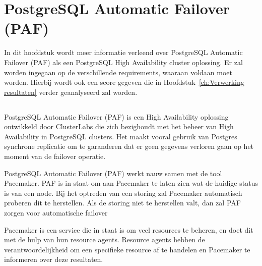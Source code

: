 
\chapter{PostgreSQL Automatic Failover (PAF)}
\label{ch:PostgreSQL Automatic Failover (PAF)}

In dit hoofdstuk wordt meer informatie verleend over PostgreSQL Automatic Failover (PAF) als een PostgreSQL High Availability cluster oplossing. Er zal worden ingegaan op de verschillende requirements, waaraan voldaan moet worden. Hierbij wordt ook een score gegeven die in Hoofdstuk~\ref{ch:Verwerking resultaten} verder geanalyseerd zal worden.



\section{}
\label{sec:Inleiding tot PostgreSQL Automatic Failover (PAF)}

PostgreSQL Automatic Failover (PAF) is een High Availability oplossing ontwikkeld door ClusterLabs die zich bezighoudt met het beheer van High Availability in PostgreSQL clusters. Het maakt vooral gebruik van Postgres synchrone replicatie om te garanderen dat er geen gegevens verloren gaan op het moment van de failover operatie. 

PostgreSQL Automatic Failover (PAF) werkt nauw samen met de tool Pacemaker. PAF is in staat om aan Pacemaker te laten zien wat de huidige status is van een node. Bij het optreden van een storing zal Pacemaker automatisch proberen dit te herstellen.
Als de storing niet te herstellen valt, dan zal PAF zorgen voor automatische failover

Pacemaker is een service die in staat is om veel resources te beheren, en doet dit met de hulp van hun resource agents. Resource agents hebben de verantwoordelijkheid om een specifieke resource af te handelen en Pacemaker te informeren over deze resultaten.

